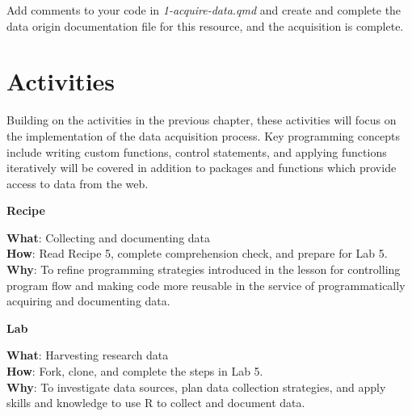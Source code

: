 \documentclass[
  letterpaper,
]{latex/krantz}
\theoremstyle{definition}
\theoremstyle{remark}
\begin{document}
Add comments to your code in \emph{1-acquire-data.qmd} and create and
complete the data origin documentation file for this resource, and the
acquisition is complete.

\section*{Activities}\label{activities-3}


Building on the activities in the previous chapter, these activities
will focus on the implementation of the data acquisition process. Key
programming concepts include writing custom functions, control
statements, and applying functions iteratively will be covered in
addition to packages and functions which provide access to data from the
web.

\begin{tcolorbox}[enhanced jigsaw, breakable, leftrule=.75mm, arc=.35mm, colframe=quarto-callout-color-frame, colback=white, left=2mm, bottomrule=.15mm, rightrule=.15mm, toprule=.15mm, opacityback=0]

\textbf{ Recipe}

\textbf{What}: Collecting and documenting data\\
\textbf{How}: Read Recipe 5, complete comprehension check, and prepare
for Lab 5.\\
\textbf{Why}: To refine programming strategies introduced in the lesson
for controlling program flow and making code more reusable in the
service of programmatically acquiring and documenting data.

\end{tcolorbox}

\begin{tcolorbox}[enhanced jigsaw, breakable, leftrule=.75mm, arc=.35mm, colframe=quarto-callout-color-frame, colback=white, left=2mm, bottomrule=.15mm, rightrule=.15mm, toprule=.15mm, opacityback=0]

\textbf{ Lab}

\textbf{What}: Harvesting research data\\
\textbf{How}: Fork, clone, and complete the steps in Lab 5.\\
\textbf{Why}: To investigate data sources, plan data collection
strategies, and apply skills and knowledge to use R to collect and
document data.

\end{tcolorbox}
\end{document}
